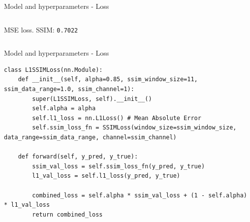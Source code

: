 \documentclass[footline=authortitle]{beamer}
\begin{document}
\begin{frame}{Model and hyperparameters - Loss}
\begin{columns}
            \newline
            \centering \small MSE loss. SSIM: \texttt{0.7022}
    \end{columns}
\end{frame}

\begin{frame}[fragile]{Model and hyperparameters - Loss}
    \begin{lstlisting}
class L1SSIMLoss(nn.Module):
    def __init__(self, alpha=0.85, ssim_window_size=11, ssim_data_range=1.0, ssim_channel=1):
        super(L1SSIMLoss, self).__init__()
        self.alpha = alpha
        self.l1_loss = nn.L1Loss() # Mean Absolute Error
        self.ssim_loss_fn = SSIMLoss(window_size=ssim_window_size, data_range=ssim_data_range, channel=ssim_channel)

    def forward(self, y_pred, y_true):
        ssim_val_loss = self.ssim_loss_fn(y_pred, y_true)
        l1_val_loss = self.l1_loss(y_pred, y_true)
        
        combined_loss = self.alpha * ssim_val_loss + (1 - self.alpha) * l1_val_loss
        return combined_loss
    \end{lstlisting}
\end{frame}
\end{document}
